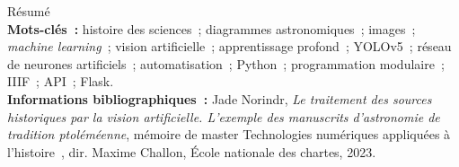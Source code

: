 \medskip	

Résumé\\

\textbf{Mots-clés~:} histoire des sciences~; diagrammes astronomiques~; images~; \textit{machine learning}~; vision artificielle~; apprentissage profond~; YOLOv5~; réseau de neurones artificiels~; automatisation~; Python~; programmation modulaire~; IIIF~; API~; Flask.\\

\textbf{Informations bibliographiques~:} Jade Norindr, \textit{Le traitement des sources historiques par la vision artificielle. L'exemple des manuscrits d'astronomie de tradition ptoléméenne}, mémoire de master \og Technologies numériques appliquées à l'histoire~\fg, dir. Maxime Challon, École nationale des chartes, 2023.
	
\clearemptydoublepage